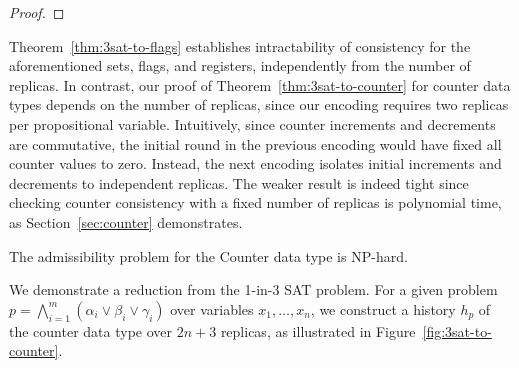\begin{proof}
\end{proof}

Theorem~\ref{thm:3sat-to-flags} establishes intractability of consistency for the aforementioned sets, flags, and registers, independently from the number of replicas. In contrast, our proof of Theorem~\ref{thm:3sat-to-counter} for counter data types depends on the number of replicas, since our encoding requires two replicas per propositional variable. Intuitively, since counter increments and decrements are commutative, the initial round in the previous encoding would have fixed all counter values to zero. Instead, the next encoding isolates initial increments and decrements to independent replicas.
The weaker result is indeed tight since checking counter consistency with a fixed number of replicas is polynomial time, as Section~\ref{sec:counter} demonstrates.

\vspace{-1mm}
\begin{theorem}
  \label{thm:3sat-to-counter}

  The admissibility problem for the Counter data type is NP-hard.

\vspace{-1mm}
\end{theorem}

We demonstrate a reduction from the 1-in-3 SAT problem. For a given problem $p = \bigwedge_{i=1}^{m} (\alpha_i \lor \beta_i \lor \gamma_i)$ over variables $x_1, \ldots, x_n$, we construct a history $h_p$ of the counter data type over $2n+3$ replicas, as illustrated in Figure~\ref{fig:3sat-to-counter}.

